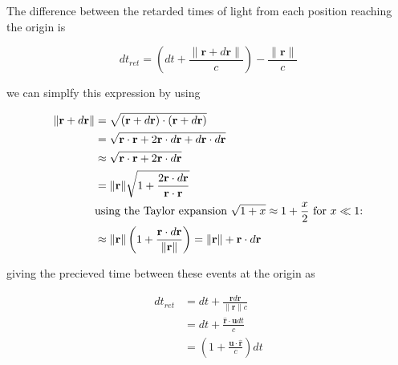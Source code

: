 The difference between the retarded times of light from each position reaching the origin is

\begin{equation}
	dt_{ret} =  \left( dt + \frac{\|\mathbf{r} + d\mathbf{r}\|}{c} \right) -  \frac{\|\mathbf{r}\|}{c}
\end{equation}

we can simplfy this expression by using

\begin{equation}
	\begin{aligned}
		\|\mathbf{r} + d\mathbf{r}\| & =  \sqrt{(\mathbf{r} + d\mathbf{r}) \cdot (\mathbf{r} + d\mathbf{r})}                                                                         \\
		                             & = \sqrt{\mathbf{r} \cdot \mathbf{r} + 2 \mathbf{r} \cdot d\mathbf{r} + d\mathbf{r} \cdot d\mathbf{r}}                                         \\
		                             & \approx \sqrt{\mathbf{r} \cdot \mathbf{r} + 2 \mathbf{r} \cdot d\mathbf{r}}                                                                   \\
		                             & = \|\mathbf{r}\| \sqrt{ 1 + \frac{2 \mathbf{r} \cdot d\mathbf{r}}{\mathbf{r} \cdot \mathbf{r}}}                                               \\
		                             & \text{using the Taylor expansion $\sqrt{1 + x} \approx 1 + \frac{x}{2}\) for \(x \ll 1$:}                                                     \\
		                             & \approx \|\mathbf{r}\| \left(1 + \frac{\mathbf{r} \cdot d\mathbf{r}}{\|\mathbf{r}\| }\right) = \|\mathbf{r}\|  + \mathbf{r} \cdot d\mathbf{r}
	\end{aligned}
\end{equation}

giving the precieved time between these events at the origin as

\begin{equation}
	\begin{aligned}
		dt_{ret} & =   dt + \frac{\mathbf{r} d\mathbf{r}}{\|\mathbf{r}\| c}               \\
		         & = dt + \frac{\hat{\mathbf{r}} \cdot \mathbf{u} dt}{ c}                 \\
		         & = \left( 1 + \frac{ \mathbf{u} \cdot \hat{\mathbf{r}} }{ c} \right) dt
	\end{aligned}
\end{equation}

